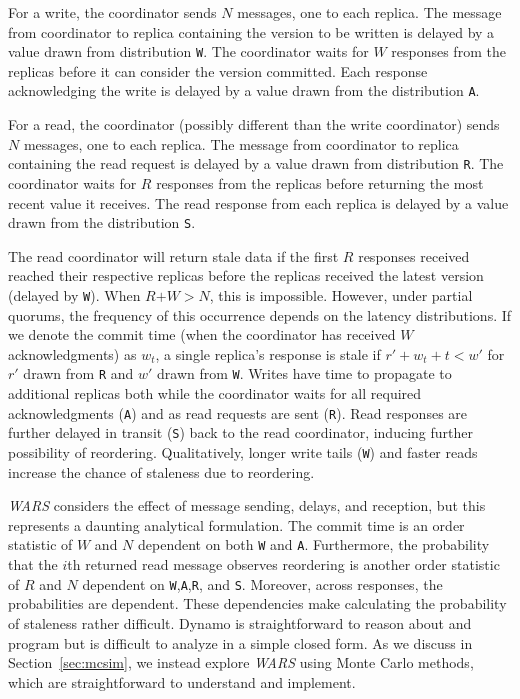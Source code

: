 \documentclass{vldb}
\begin{document}
For a write, the coordinator sends $N$ messages, one to each
replica. The message from coordinator to replica containing the
version to be written is delayed by a value drawn from distribution
\texttt{W}.  The coordinator waits for $W$ responses from the replicas
before it can consider the version committed.  Each response
acknowledging the write is delayed by a value drawn from the
distribution \texttt{A}.

For a read, the coordinator (possibly different than the write
coordinator) sends $N$ messages, one to each replica.  The message
from coordinator to replica containing the read request is delayed by
a value drawn from distribution \texttt{R}.  The coordinator waits
for $R$ responses from the replicas before returning the most recent
value it receives.  The read response from each replica is delayed by
a value drawn from the distribution \texttt{S}.

The read coordinator will return stale data if the first $R$ responses
received reached their respective replicas before the replicas
received the latest version (delayed by \texttt{W}).  When
$R$$+$$W$$>$$N$, this is impossible.  However, under partial quorums,
the frequency of this occurrence depends on the latency distributions.
If we denote the commit time (when the coordinator has received $W$
acknowledgments) as $w_t$, a single replica's response is stale if
$r'+w_t+t< w'$ for $r'$ drawn from \texttt{R} and $w'$ drawn from
\texttt{W}.  Writes have time to propagate to additional replicas both
while the coordinator waits for all required acknowledgments
(\texttt{A}) and as read requests are sent (\texttt{R}).  Read
responses are further delayed in transit (\texttt{S}) back to the read
coordinator, inducing further possibility of reordering.
Qualitatively, longer write tails (\texttt{W}) and faster reads
increase the chance of staleness due to reordering.

\textit{WARS} considers the effect of message sending, delays, and
reception, but this represents a daunting analytical formulation.  The
commit time is an order statistic of $W$ and $N$ dependent on both
\texttt{W} and \texttt{A}.  Furthermore, the probability that the
$i$th returned read message observes reordering is another order
statistic of $R$ and $N$ dependent on
\texttt{W},\texttt{A},\texttt{R}, and \texttt{S}.  Moreover, across
responses, the probabilities are dependent. These dependencies make
calculating the probability of staleness rather difficult.  Dynamo is
straightforward to reason about and program but is difficult to
analyze in a simple closed form.  As we discuss in
Section~\ref{sec:mcsim}, we instead explore \textit{WARS} using Monte
Carlo methods, which are straightforward to understand and implement.
\end{document}
